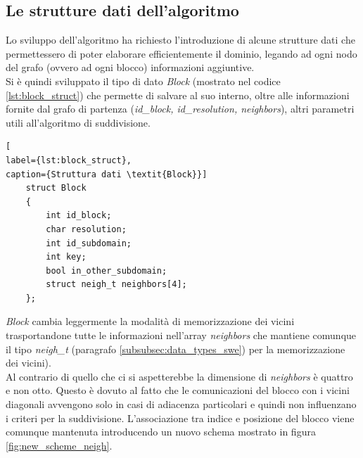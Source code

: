 \subsection{Le strutture dati dell'algoritmo}
Lo sviluppo dell'algoritmo ha richiesto l'introduzione di alcune strutture dati che permettessero di poter elaborare efficientemente il dominio, legando ad ogni nodo del grafo (ovvero ad ogni blocco) informazioni aggiuntive.\\
Si è quindi sviluppato il tipo di dato \emph{Block} (mostrato nel codice \ref{lst:block_struct}) che permette di salvare al suo interno, oltre alle informazioni fornite dal grafo di partenza (\textit{id\_block, id\_resolution, neighbors}), altri parametri utili all'algoritmo di suddivisione.\\
\begin{lstlisting}[ 
label={lst:block_struct},
caption={Struttura dati \textit{Block}}]
	struct Block
	{
		int id_block;
		char resolution;
		int id_subdomain;
		int key;
		bool in_other_subdomain;
		struct neigh_t neighbors[4];
	};
\end{lstlisting}
\textit{Block} cambia leggermente la modalità di memorizzazione dei vicini trasportandone tutte le informazioni nell'array \textit{neighbors} che mantiene comunque il tipo \textit{neigh\_t} (paragrafo \ref{subsubsec:data_types_swe}) per la memorizzazione dei vicini).\\
Al contrario di quello che ci si aspetterebbe la dimensione di \textit{neighbors} è quattro e non otto. Questo è dovuto al fatto che le comunicazioni del blocco con i vicini diagonali avvengono solo in casi di adiacenza particolari e quindi non influenzano i criteri per la suddivisione. L'associazione tra indice e posizione del blocco viene comunque mantenuta introducendo un nuovo schema mostrato in figura \ref{fig:new_scheme_neigh}.\\
